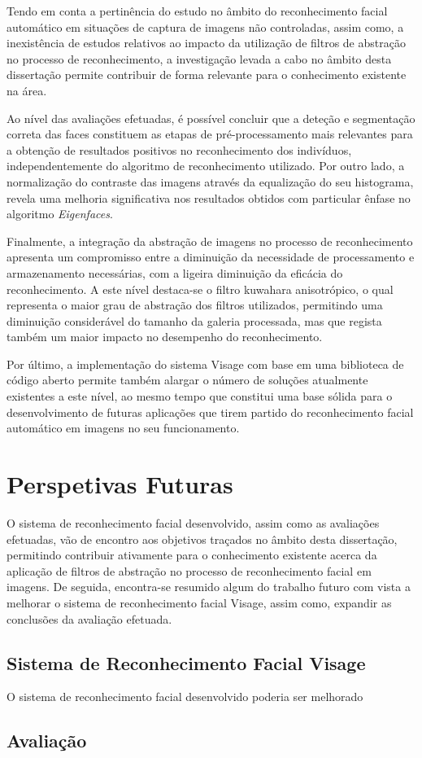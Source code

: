Tendo em conta a pertinência do estudo no âmbito do reconhecimento facial automático em situações de captura de imagens não controladas, assim como, a inexistência de estudos relativos ao impacto da utilização de filtros de abstração no processo de reconhecimento, a investigação levada a cabo no âmbito desta dissertação permite contribuir de forma relevante para o conhecimento existente na área. 

Ao nível das avaliações efetuadas, é possível concluir que a deteção e segmentação correta das faces constituem as etapas de pré-processamento mais relevantes para a obtenção de resultados positivos no reconhecimento dos indivíduos, independentemente do algoritmo de reconhecimento utilizado. Por outro lado, a normalização do contraste das imagens através da equalização do seu histograma, revela uma melhoria significativa nos resultados obtidos com particular ênfase no algoritmo \textit{Eigenfaces}. 

Finalmente, a integração da abstração de imagens no processo de reconhecimento apresenta um compromisso entre a diminuição da necessidade de processamento e armazenamento necessárias, com a ligeira diminuição da eficácia do reconhecimento. A este nível destaca-se o filtro kuwahara anisotrópico, o qual representa o maior grau de abstração dos filtros utilizados, permitindo uma diminuição considerável do tamanho da galeria processada, mas que regista também um maior impacto no desempenho do reconhecimento.

Por último, a implementação do sistema Visage com base em uma biblioteca de código aberto permite também alargar o número de soluções atualmente existentes a este nível, ao mesmo tempo que constitui uma base sólida para o desenvolvimento de futuras aplicações que tirem partido do reconhecimento facial automático em imagens no seu funcionamento.

\section{Perspetivas Futuras}
O sistema de reconhecimento facial desenvolvido, assim como as avaliações efetuadas, vão de encontro aos objetivos traçados no âmbito desta dissertação, permitindo contribuir ativamente para o conhecimento existente acerca da aplicação de filtros de abstração no processo de reconhecimento facial em imagens. De seguida, encontra-se resumido algum do trabalho futuro com vista a melhorar o sistema de reconhecimento facial Visage, assim como, expandir as conclusões da avaliação efetuada.

\subsection{Sistema de Reconhecimento Facial Visage}
O sistema de reconhecimento facial desenvolvido poderia ser melhorado
\subsection{Avaliação}

